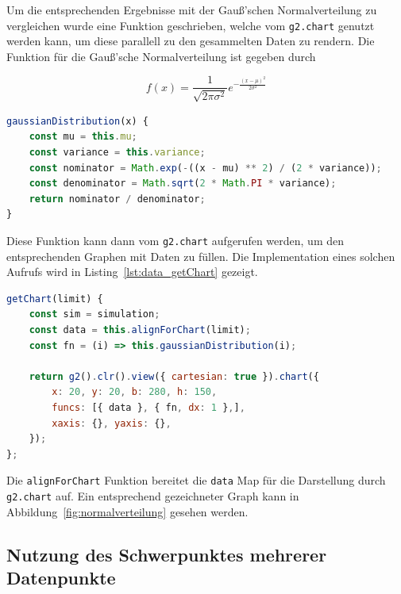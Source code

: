 Um die entsprechenden Ergebnisse mit der Gau{\ss}'schen Normalverteilung zu vergleichen wurde eine Funktion geschrieben, welche vom \lstinline{g2.chart} genutzt werden kann, um diese parallell zu den gesammelten Daten zu rendern.
Die Funktion für die Gau{\ss}'sche Normalverteilung ist gegeben durch

\begin{equation}
    f(x) = \frac{1}{\sqrt{2\pi\sigma^2}}e^{-\frac{(x-\mu)^2}{2\sigma^2}}
\end{equation}

\begin{lstlisting}[language=JavaScript, caption={Definition der \lstinline{gaussianDistribution} Funktion, welche die Normalverteilung für die gegebene Varianz und den Erwartungswert formt.}, label={lst:data_gauss}]
gaussianDistribution(x) {
    const mu = this.mu;
    const variance = this.variance;
    const nominator = Math.exp(-((x - mu) ** 2) / (2 * variance));
    const denominator = Math.sqrt(2 * Math.PI * variance);
    return nominator / denominator;
}
\end{lstlisting}

Diese Funktion kann dann vom \lstinline{g2.chart} aufgerufen werden, um den entsprechenden Graphen mit Daten zu füllen.
Die Implementation eines solchen Aufrufs wird in Listing~\ref{lst:data_getChart} gezeigt.

\begin{lstlisting}[language=JavaScript, caption={Definition der \lstinline{getChart} Funktion der \lstinline{Data} Klasse.}, label={lst:data_getChart}]
getChart(limit) {
    const sim = simulation;
    const data = this.alignForChart(limit);
    const fn = (i) => this.gaussianDistribution(i);

    return g2().clr().view({ cartesian: true }).chart({
        x: 20, y: 20, b: 280, h: 150,
        funcs: [{ data }, { fn, dx: 1 },],
        xaxis: {}, yaxis: {},
    });
};
\end{lstlisting}

Die \lstinline{alignForChart} Funktion bereitet die \lstinline{data} Map für die Darstellung durch \lstinline{g2.chart} auf.
Ein entsprechend gezeichneter Graph kann in Abbildung~\ref{fig:normalverteilung} gesehen werden.

\subsection{Nutzung des Schwerpunktes mehrerer Datenpunkte}\label{ch:nutzung_des_schwerpunktes}

